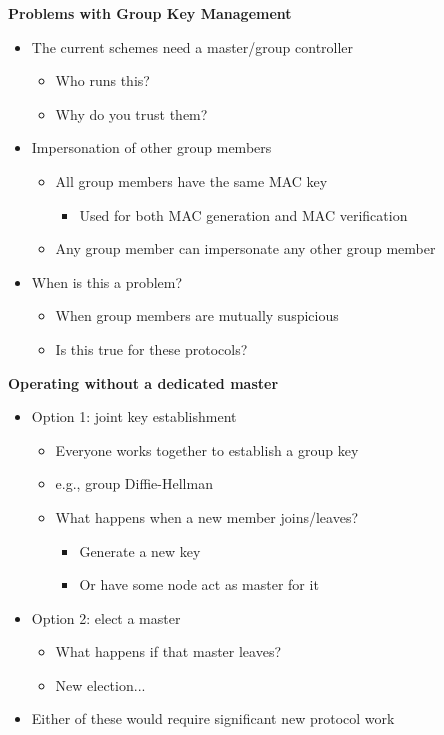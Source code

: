 \documentclass[helvetica]{seminar}
\newcommand{\heading}[1]{%
  \begin{center} 
    \large\bf 
    #1 
  \end{center} 
  \vspace{.4 in}}
\begin{document}
\begin{slide}
\heading{Problems with Group Key Management}

\begin{itemize}
\item The current schemes need a master/group controller
\begin{itemize}
\item Who runs this?
\item Why do you trust them?
\end{itemize}
\item Impersonation of other group members
\begin{itemize}
\item All group members have the same MAC key
\begin{itemize}
\item Used for both MAC generation and MAC verification
\end{itemize}
\item Any group member can impersonate any other group member
\end{itemize}
\item When is this a problem?
\begin{itemize}
\item When group members are mutually suspicious
\item Is this true for these protocols?
\end{itemize}
\end{itemize}
\end{slide}


\begin{slide}
\heading{Operating without a dedicated master}

\begin{itemize}
\item Option 1: joint key establishment
\begin{itemize}
\item Everyone works together to establish a group key
\item e.g., group Diffie-Hellman
\item What happens when a new member joins/leaves?
\begin{itemize}
\item Generate a new key
\item Or have some node act as master for it
\end{itemize}
\end{itemize}
\item Option 2: elect a master
\begin{itemize}
\item What happens if that master leaves?
\item New election...
\end{itemize}
\item Either of these would require significant new protocol work
\end{itemize}
\end{slide}
\end{document}
